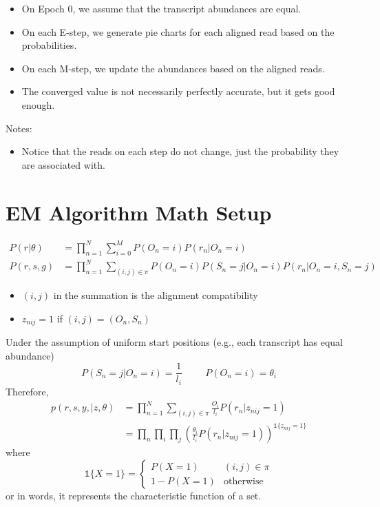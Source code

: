 \documentclass[10pt]{article}
\begin{document}
\begin{itemize}
    \item On Epoch 0, we assume that the transcript abundances are equal.
    \item On each E-step, we generate pie charts for each aligned read based on the probabilities.
    \item On each M-step, we update the abundances based on the aligned reads.
    \item The converged value is not necessarily perfectly accurate, but it gets good enough.
\end{itemize}
Notes:
\begin{itemize}
    \item Notice that the reads on each step do not change, just the probability they are associated with.
\end{itemize}

\section*{EM Algorithm Math Setup}
\begin{align*}
    P(r \vert \theta) &= \prod_{n = 1}^N \sum_{i = 0}^M P(O_n = i) P(r_n \vert O_n = i)\\
    P(r, s, g) &= \prod_{n = 1}^N \sum_{(i, j) \in \pi} P(O_n = i) P(S_n = j \vert O_n = i) P(r_n \vert O_n = i, S_n = j)
\end{align*}
\begin{itemize}
    \item $(i, j)$ in the summation is the alignment compatibility
    \item $z_{nij} = 1$ if $(i, j) = (O_n, S_n)$
\end{itemize}
Under the assumption of uniform start positions (e.g., each transcript has equal abundance)
\[P(S_n = j \vert O_n = i) = \frac{1}{l_i} \hspace{1cm} P(O_n = i) = \theta_i\]
Therefore,
\begin{align*}
    p(r, s, y, \vert z, \theta) &= \prod_{n = 1}^N \sum_{(i, j) \in \pi} \frac{O_i}{l_i} P(r_n \vert z_{nij} = 1)\\
    &= \prod_n \prod_i \prod_j \left(\frac{\theta_i}{l_i} P(r_n \vert z_{nij} = 1)\right)^{\mathds{1}\{z_{nij} = 1\}}
\end{align*}
where
\[\mathds{1}\{X = 1\} = \begin{cases} P(X = 1) & (i, j) \in \pi \\ 1 - P(X = 1) & \text{otherwise}\end{cases}\]
or in words, it represents the characteristic function of a set.
\end{document}
